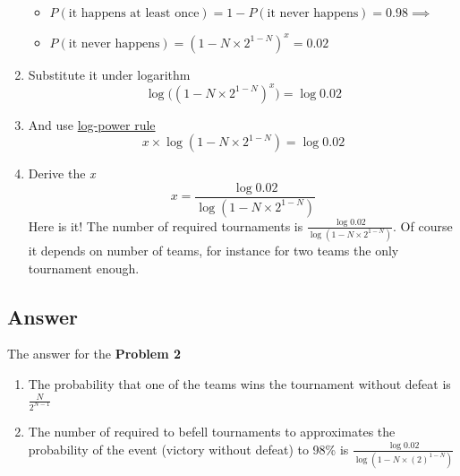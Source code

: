 \documentclass[14pt, a4paper]{extarticle}
\begin{document}
\begin{enumerate}
\begin{itemize}
        \item \(P(\text{it happens at least once}) = 1 - P(\text{it never happens}) = 0.98 \implies \)
        \item \(P(\text{it never happens}) = \left(1 - N \times 2^{1 - N}\right)^x = 0.02\)
    \end{itemize}
    \item Substitute it under logarithm
    \[
        \log \bigl(\left(1 - N \times 2^{1 - N}\right)^x\bigr) = \log 0.02     
    \]
    \item And use \href{https://www.rapidtables.com/math/algebra/logarithm/Logarithm_Rules.html#power%20rule}{log-power rule}
    \[
        x \times \log \left(1 - N \times 2^{1 - N}\right) = \log 0.02
    \]
    \item Derive the \emph{x}
    \[
        x = \frac{\log 0.02}{\log \left(1 - N \times 2^{1 - N}\right)}  
    \]
    Here is it! The number of required tournaments is \(\frac{\log 0.02}{\log \left(1 - N \times 2^{1 - N}\right)} \).
    Of course it depends on number of teams, for instance for two teams the only tournament enough.
    
\end{enumerate}

\subsection*{Answer}
The answer for the \textbf{Problem 2}

\begin{enumerate}
    \item The probability that one of the teams wins the tournament without defeat is \(\frac{N}{2^{N-1}}\)
    \item The number of required to befell tournaments to approximates the probability of the event (victory without defeat) to 98\% is 
    \(\frac{\log 0.02}{\log \left(1 - N \times (2)^{1 - N}\right)}\)
\end{enumerate}
\end{document}
